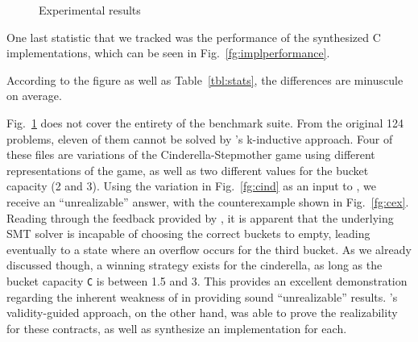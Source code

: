 \begin{figure}[!t]
\centering
{}
\quad
{}
\quad
{}
\caption{Experimental results}
\label{fg:results}
\end{figure}

 One last statistic that we tracked was the performance of the synthesized C
 implementations, which can be seen in Fig.~\ref{fg:implperformance}.
 \iffalse
  For this purpose, we translated the
 generated witnesses from \jsyn and \jsynvg solutions using
 \smtlibtoc under the same set of options.
 \fi
 According to the figure as well as Table~\ref{tbl:stats}, the differences are minuscule on average.
\iffalse 
while \jsyn implementations are faster, the difference is minuscule on average.
This small difference may occur due to the fact that \jsyn creates separate skolem functions for the initial evaluation
(when \%init is true)

and subsequent evaluations, whereas currently \jsynvg uses a single function for both cases, and as such requires the evaluation of richer expressions prior to choosing a proper reaction.
\fi


Fig.~\ref{fg:results} does not cover the entirety of the
benchmark suite. From the original 124 problems, eleven of them cannot be
solved by \jsyn's k-inductive approach. 
Four of these files are variations of
the Cinderella-Stepmother game using different representations of the game, as well as two different values
for the bucket capacity (2 and 3). Using the variation in Fig.~\ref{fg:cind} as an input to \jsyn, we receive an ``unrealizable'' answer, with the counterexample shown
in Fig.~\ref{fg:cex}. Reading through the feedback provided by \jsyn, it is
apparent that the underlying SMT solver is incapable of choosing the correct
buckets to empty, leading eventually to a state where an overflow occurs for the
third bucket. As we already discussed though, a winning strategy exists for the
cinderella, as long as the bucket capacity \texttt{C} is between 1.5 and 3. This
provides an excellent demonstration regarding the inherent weakness of \jsyn
in providing sound ``unrealizable'' results. \jsynvg's validity-guided approach,
on the other hand, was able to prove the realizability for these contracts, as
well as synthesize an implementation for each.

